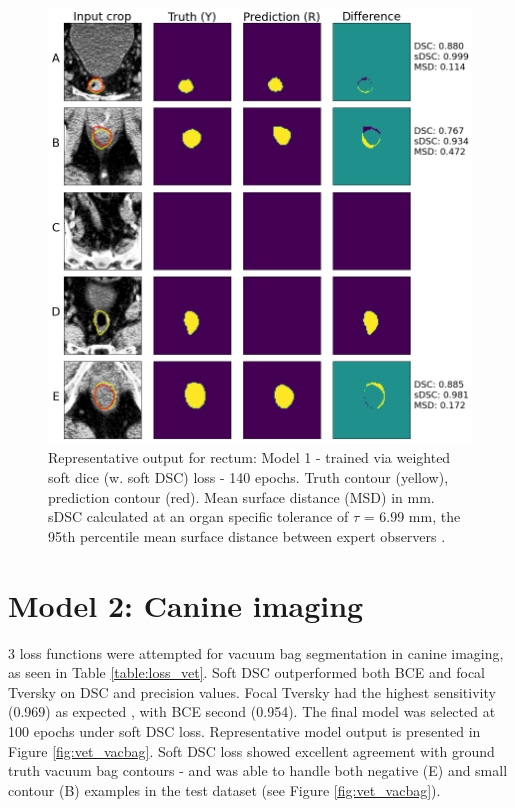 \begin{figure}[H]
	\begin{center}
		\includegraphics[width=1.0\textwidth]{figures/prostate_rectum}
		\caption{Representative output for rectum: Model 1 - trained via weighted soft dice (w. soft DSC) loss - 140 epochs. Truth contour (yellow), prediction contour (red). Mean surface distance (MSD) in mm. sDSC \cite{Nikolov_2018} calculated at an organ specific tolerance of $\tau$ = 6.99 mm, the 95th percentile mean surface distance between expert observers \cite{Roach_2019}.}
		\label{fig:prostate_rectum}
	\end{center}
\end{figure}

\section{Model 2: Canine imaging}

3
loss functions were attempted for vacuum bag segmentation in canine imaging, as seen in Table \ref{table:loss_vet}. Soft DSC outperformed both BCE and focal Tversky on DSC and precision values. Focal Tversky had the highest sensitivity (0.969) as expected \cite{Khan2019}, with BCE second (0.954). The final model was selected at 100 epochs under soft DSC loss. Representative model output is presented in Figure \ref{fig:vet_vacbag}. Soft DSC loss showed excellent agreement with ground truth vacuum bag contours - and was able to handle both negative (E) and small contour (B) examples in the test dataset (see Figure \ref{fig:vet_vacbag}).

